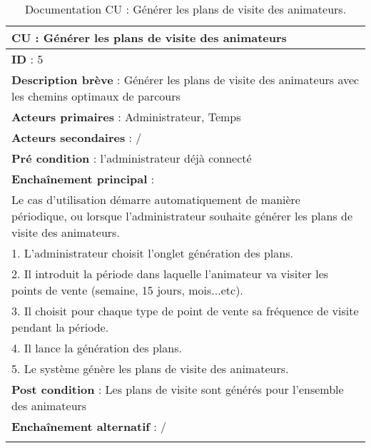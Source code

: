 \renewcommand{\arraystretch}{1.5}
\begin{xltabular}{\linewidth}{|X|}
    \hline
    \textbf{CU} : Générer les plans de visite des animateurs     \\\hline
    \textbf{ID} :  5   \\\hline
    \textbf{Description brève} : Générer les plans de visite des animateurs avec les chemins optimaux de parcours  \\\hline
    \textbf{Acteurs primaires} : Administrateur, Temps     \\\hline
    \textbf{Acteurs secondaires} :  /    \\\hline
    \textbf{Pré condition} :  l'administrateur déjà connecté    \\\hline
    \textbf{Enchaînement principal} : \\
    Le cas d'utilisation démarre automatiquement de manière périodique, ou lorsque l'administrateur souhaite générer les plans de visite des animateurs. \\
    1. L'administrateur choisit l'onglet génération des plans. \\
    2. Il introduit la période dans laquelle l'animateur va visiter les points de vente (semaine, 15 jours, mois...etc). \\
    3. Il choisit pour chaque type de point de vente sa fréquence de visite pendant la période. \\
    4. Il lance la génération des plans. \\
    5. Le système génère les plans de visite des animateurs.
    \\\hline
    \textbf{Post condition} :  Les plans de visite sont générés pour l'ensemble des animateurs   \\\hline
    \textbf{Enchaînement alternatif} :   /   \\\hline

    \caption{Documentation CU : Générer les plans de visite des animateurs.}
    \label{tab:cu-specs1}
\end{xltabular}
\FloatBarrier

\clearpage

